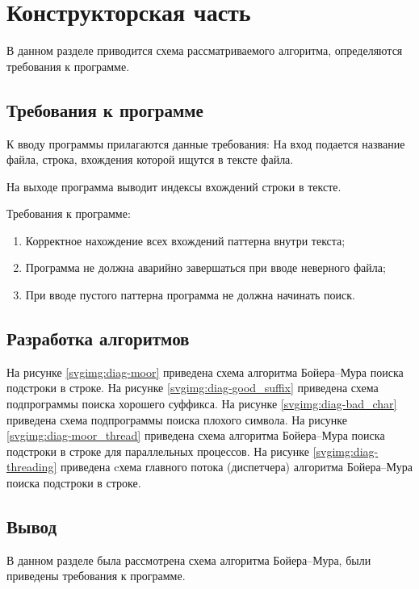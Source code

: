 \chapter{Конструкторская часть}
В данном разделе приводится схема рассматриваемого алгоритма, определяются требования к программе.

\section{Требования к программе}
К вводу программы прилагаются данные требования:
На вход подается название файла, строка, вхождения которой ищутся в тексте файла. 


На выходе программа выводит индексы вхождений строки в тексте. 


Требования к программе:
\begin{enumerate}
	\item Корректное нахождение всех вхождений паттерна внутри текста; 
	\item Программа не должна аварийно завершаться при вводе неверного файла;
	\item При вводе пустого паттерна программа не должна начинать поиск.
\end{enumerate}
\section{Разработка алгоритмов}

На рисунке \ref{svgimg:diag-moor} приведена схема алгоритма Бойера--Мура поиска подстроки в строке.
На рисунке \ref{svgimg:diag-good_suffix} приведена схема подпрограммы поиска хорошего суффикса.
На рисунке \ref{svgimg:diag-bad_char} приведена схема подпрограммы поиска плохого символа.
На рисунке \ref{svgimg:diag-moor_thread} приведена схема алгоритма Бойера--Мура поиска подстроки в строке для параллельных процессов.
На рисунке \ref{svgimg:diag-threading} приведена cхема главного потока (диспетчера) алгоритма Бойера--Мура поиска подстроки в строке.



\newpage

\section*{Вывод}
В данном разделе была рассмотрена схема алгоритма  Бойера--Мура, были приведены требования к программе.


